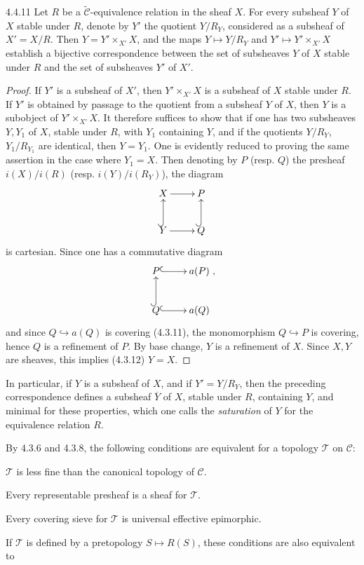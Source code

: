 \begin{proposition}{4.4.11}\label{IV.4.4.11}
Let \(R\) be a \(\widetilde{\mathcal C}\)-equivalence relation
in the sheaf \(X\). For every subsheaf \(Y\) of \(X\) stable under
\(R\), denote by \(Y'\) the quotient \(Y/R_Y\), considered as a
subsheaf of \(X'=X/R\).
Then \(Y=Y'\times_{X'}X\), and the maps \(Y\mapsto Y/R_Y\)
and \(Y'\mapsto Y'\times_{X'}X\) establish a bijective
correspondence between the set of subsheaves \(Y\) of \(X\)
stable under \(R\) and the set of subsheaves \(Y'\) of \(X'\).
\end{proposition}
\begin{proof}
If \(Y'\) is a subsheaf of \(X'\), then \(Y'\times_{X'}X\)
is a subsheaf of \(X\) stable under \(R\).
If \(Y'\) is obtained by passage to the quotient from a subsheaf
\(Y\) of \(X\), then \(Y\) is a subobject of \(Y'\times_{X'}X\).
It therefore suffices to show that if one has two subsheaves
\(Y,Y_1\) of \(X\), stable under \(R\), with \(Y_1\) containing
\(Y\), and if the quotients \(Y/R_Y\), \(Y_1/R_{Y_1}\) are
identical, then \(Y=Y_1\). One is evidently reduced to proving
the same assertion in the case where \(Y_1=X\).
Then denoting by \(P\) (resp. \(Q\)) the presheaf
\(i(X)/i(R)\) (resp. \(i(Y)/i(R_Y)\)), the diagram
\[
\xymatrix{
X\ar[r] & P\\
Y\ar@{^{(}->}[u]\ar[r] & Q\ar@{^{(}->}[u] }
\]
is cartesian. Since one has a commutative diagram
\[
\xymatrix{
P\ar@{^{(}->}[r] & a(P)\\
Q\ar@{^{(}->}[u]\ar@{^{(}->}[r] & a(Q) },
\]
and since \(Q\hookrightarrow a(Q)\) is covering (4.3.11),
the monomorphism \(Q\hookrightarrow P\) is covering,
hence \(Q\) is a refinement of \(P\).
By base change, \(Y\) is a refinement of \(X\).
Since \(X,Y\) are sheaves, this implies (4.3.12) \(Y=X\).
\end{proof}

\label{IV.4.4.12}
In particular, if \(Y\) is a subsheaf of \(X\), and if \(Y'=Y/R_Y\),
then the preceding correspondence defines a subsheaf \(\overline Y\)
of \(X\), stable under \(R\), containing \(Y\), and minimal
for these properties, which one calls the \emph{saturation} of
\(Y\) for the equivalence relation \(R\).

By 4.3.6 and 4.3.8, the following conditions are equivalent
for a topology \(\mathcal T\) on \(\mathcal C\):
\begin{enumeratei}
\item \(\mathcal T\) is less fine than the canonical topology of \(\mathcal C\).
\item Every representable presheaf is a sheaf for \(\mathcal T\).
\item Every covering sieve for \(\mathcal T\) is universal effective epimorphic.
\end{enumeratei}
If \(\mathcal T\) is defined by a pretopology \(S\mapsto R(S)\),
these conditions are also equivalent to

